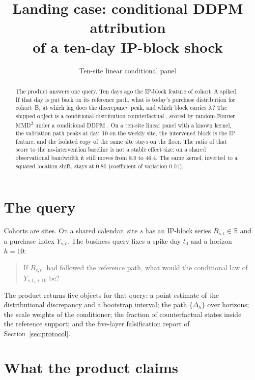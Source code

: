 \documentclass[11pt]{article}
\title{Landing case: conditional DDPM attribution\\
of a ten-day IP-block shock}
\author{Ten-site linear conditional panel}
\date{}
\begin{document}
\maketitle

\begin{abstract}
The product answers one query.
Ten days ago the IP-block feature of cohort~A spiked.
If that day is put back on its reference path, what is today's purchase distribution for cohort~B, at which lag does the discrepancy peak, and which block carries it?
The shipped object is a conditional-distribution counterfactual \citep{chernozhukov2013inference}, scored by random-Fourier MMD\textsuperscript{2} \citep{gretton2012kernel,rahimi2007random} under a conditional DDPM \citep{ho2020denoising}.
On a ten-site linear panel with a known kernel, the validation path peaks at day~10 on the weekly site, the intervened block is the IP feature, and the isolated copy of the same site stays on the floor.
The ratio of that score to the no-intervention baseline is not a stable effect size: on a shared observational bandwidth it still moves from $8.9$ to $46.4$.
The same kernel, inverted to a squared location shift, stays at $0.80$ (coefficient of variation $0.01$).
\end{abstract}

\section{The query}
\label{sec:query}

Cohorts are sites.
On a shared calendar, site $s$ has an IP-block series $B_{s,t}\in\mathbb{R}$ and a purchase index $Y_{s,t}$.
The business query fixes a spike day $t_0$ and a horizon $h=10$:
\begin{quote}
If $B_{s,t_0}$ had followed the reference path, what would the conditional law of $Y_{s,t_0+10}$ be?
\end{quote}
The product returns five objects for that query:
a point estimate of the distributional discrepancy and a bootstrap interval;
the path $\{\Delta_h\}$ over horizons;
the scale weights of the conditioner;
the fraction of counterfactual states inside the reference support;
and the five-layer falsification report of Section~\ref{sec:protocol}.

\section{What the product claims}
\label{sec:contract}
\end{document}
